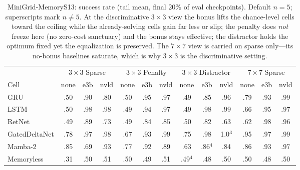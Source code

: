 \begin{table}[t]\centering
\caption{MiniGrid-MemoryS13: success rate (tail mean, final 20\% of eval checkpoints). Default $n{=}5$; superscripts mark $n{\neq}5$. At the discriminative $3\times3$ view the bonus lifts the chance-level cells toward the ceiling while the already-solving cells gain far less or slip; the penalty does \emph{not} freeze here (no zero-cost sanctuary) and the bonus stays effective; the distractor holds the optimum fixed yet the equalization is preserved. The $7\times7$ view is carried on sparse only---its no-bonus baselines saturate, which is why $3\times3$ is the discriminative setting.}
\label{tab:s13}\small\setlength{\tabcolsep}{4.5pt}
\begin{tabular}{@{}l ccc ccc ccc ccc@{}}\toprule
 & \multicolumn{3}{c}{$3\times3$ Sparse} & \multicolumn{3}{c}{$3\times3$ Penalty} & \multicolumn{3}{c}{$3\times3$ Distractor} & \multicolumn{3}{c}{$7\times7$ Sparse} \\
\cmidrule(lr){2-4}\cmidrule(lr){5-7}\cmidrule(lr){8-10}\cmidrule(lr){11-13}
Cell & none & e3b & nvld & none & e3b & nvld & none & e3b & nvld & none & e3b & nvld \\\midrule
GRU & .50 & .90 & .80 & .50 & .95 & .97 & .49 & .85 & .96 & .79 & .93 & .99 \\
LSTM & .50 & .98 & .98 & .49 & .94 & .97 & .49 & .98 & .99 & .66 & .95 & .97 \\
RetNet & .49 & .89 & .73 & .49 & .84 & .85 & .50 & .82 & .63 & .62 & .98 & .96 \\
GatedDeltaNet & .78 & .97 & .98 & .67 & .93 & .99 & .75 & .98 & 1.0$^{3}$ & .95 & .97 & .99 \\
Mamba-2 & .85 & .69 & .93 & .77 & .92 & .89 & .63 & .86$^{4}$ & .84 & .86 & .93 & .97 \\
Memoryless & .31 & .50 & .51 & .50 & .49 & .51 & .49$^{4}$ & .48 & .50 & .50 & .48 & .50 \\
\bottomrule\end{tabular}\end{table}

